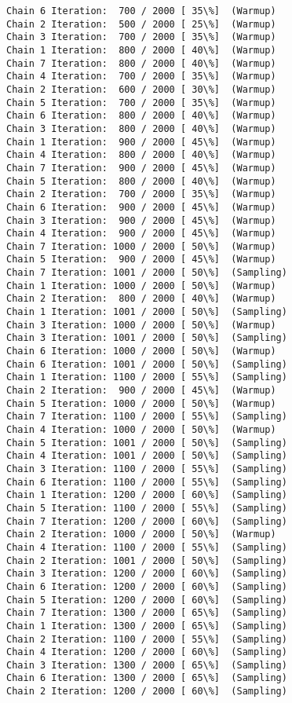\documentclass[11pt]{article}
\begin{document}
\begin{Verbatim}[commandchars=\\\{\}]
Chain 6 Iteration:  700 / 2000 [ 35\%]  (Warmup)
Chain 2 Iteration:  500 / 2000 [ 25\%]  (Warmup)
Chain 3 Iteration:  700 / 2000 [ 35\%]  (Warmup)
Chain 1 Iteration:  800 / 2000 [ 40\%]  (Warmup)
Chain 7 Iteration:  800 / 2000 [ 40\%]  (Warmup)
Chain 4 Iteration:  700 / 2000 [ 35\%]  (Warmup)
Chain 2 Iteration:  600 / 2000 [ 30\%]  (Warmup)
Chain 5 Iteration:  700 / 2000 [ 35\%]  (Warmup)
Chain 6 Iteration:  800 / 2000 [ 40\%]  (Warmup)
Chain 3 Iteration:  800 / 2000 [ 40\%]  (Warmup)
Chain 1 Iteration:  900 / 2000 [ 45\%]  (Warmup)
Chain 4 Iteration:  800 / 2000 [ 40\%]  (Warmup)
Chain 7 Iteration:  900 / 2000 [ 45\%]  (Warmup)
Chain 5 Iteration:  800 / 2000 [ 40\%]  (Warmup)
Chain 2 Iteration:  700 / 2000 [ 35\%]  (Warmup)
Chain 6 Iteration:  900 / 2000 [ 45\%]  (Warmup)
Chain 3 Iteration:  900 / 2000 [ 45\%]  (Warmup)
Chain 4 Iteration:  900 / 2000 [ 45\%]  (Warmup)
Chain 7 Iteration: 1000 / 2000 [ 50\%]  (Warmup)
Chain 5 Iteration:  900 / 2000 [ 45\%]  (Warmup)
Chain 7 Iteration: 1001 / 2000 [ 50\%]  (Sampling)
Chain 1 Iteration: 1000 / 2000 [ 50\%]  (Warmup)
Chain 2 Iteration:  800 / 2000 [ 40\%]  (Warmup)
Chain 1 Iteration: 1001 / 2000 [ 50\%]  (Sampling)
Chain 3 Iteration: 1000 / 2000 [ 50\%]  (Warmup)
Chain 3 Iteration: 1001 / 2000 [ 50\%]  (Sampling)
Chain 6 Iteration: 1000 / 2000 [ 50\%]  (Warmup)
Chain 6 Iteration: 1001 / 2000 [ 50\%]  (Sampling)
Chain 1 Iteration: 1100 / 2000 [ 55\%]  (Sampling)
Chain 2 Iteration:  900 / 2000 [ 45\%]  (Warmup)
Chain 5 Iteration: 1000 / 2000 [ 50\%]  (Warmup)
Chain 7 Iteration: 1100 / 2000 [ 55\%]  (Sampling)
Chain 4 Iteration: 1000 / 2000 [ 50\%]  (Warmup)
Chain 5 Iteration: 1001 / 2000 [ 50\%]  (Sampling)
Chain 4 Iteration: 1001 / 2000 [ 50\%]  (Sampling)
Chain 3 Iteration: 1100 / 2000 [ 55\%]  (Sampling)
Chain 6 Iteration: 1100 / 2000 [ 55\%]  (Sampling)
Chain 1 Iteration: 1200 / 2000 [ 60\%]  (Sampling)
Chain 5 Iteration: 1100 / 2000 [ 55\%]  (Sampling)
Chain 7 Iteration: 1200 / 2000 [ 60\%]  (Sampling)
Chain 2 Iteration: 1000 / 2000 [ 50\%]  (Warmup)
Chain 4 Iteration: 1100 / 2000 [ 55\%]  (Sampling)
Chain 2 Iteration: 1001 / 2000 [ 50\%]  (Sampling)
Chain 3 Iteration: 1200 / 2000 [ 60\%]  (Sampling)
Chain 6 Iteration: 1200 / 2000 [ 60\%]  (Sampling)
Chain 5 Iteration: 1200 / 2000 [ 60\%]  (Sampling)
Chain 7 Iteration: 1300 / 2000 [ 65\%]  (Sampling)
Chain 1 Iteration: 1300 / 2000 [ 65\%]  (Sampling)
Chain 2 Iteration: 1100 / 2000 [ 55\%]  (Sampling)
Chain 4 Iteration: 1200 / 2000 [ 60\%]  (Sampling)
Chain 3 Iteration: 1300 / 2000 [ 65\%]  (Sampling)
Chain 6 Iteration: 1300 / 2000 [ 65\%]  (Sampling)
Chain 2 Iteration: 1200 / 2000 [ 60\%]  (Sampling)

\end{Verbatim}
\end{document}
